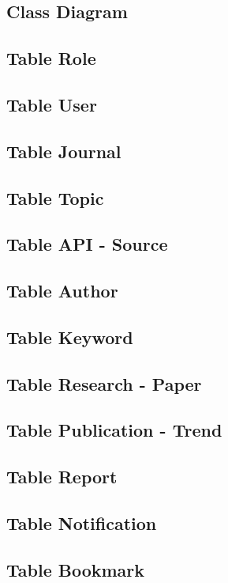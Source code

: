 \subsection{Class Diagram}

\subsection*{Table Role}

\subsection*{Table User}

\subsection*{Table Journal}

\subsection*{Table Topic}

\subsection*{Table API - Source}

\subsection*{Table Author}

\subsection*{Table Keyword}

\subsection*{Table Research - Paper}

\subsection*{Table Publication - Trend}

\subsection*{Table Report}

\subsection*{Table Notification}

\subsection*{Table Bookmark}